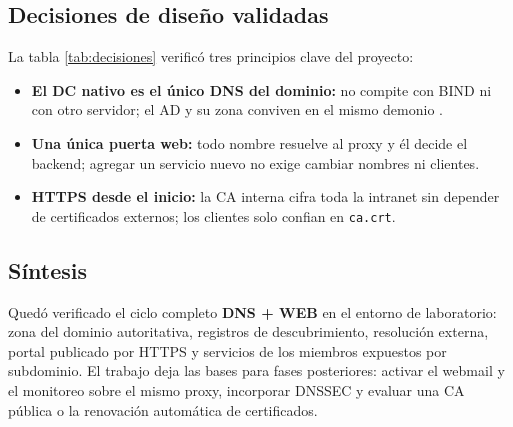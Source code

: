 \subsection{Decisiones de dise\~no validadas}

La tabla \ref{tab:decisiones} verific\'o tres principios clave del proyecto:

\begin{itemize}
  \item \textbf{El DC nativo es el \'unico DNS del dominio:} no compite con
        BIND ni con otro servidor; el AD y su zona conviven en el mismo
        demonio \citep{sambateam2024}.
  \item \textbf{Una \'unica puerta web:} todo nombre resuelve al proxy y \'el
        decide el backend; agregar un servicio nuevo no exige cambiar nombres
        ni clientes.
  \item \textbf{HTTPS desde el inicio:} la CA interna cifra toda la intranet
        sin depender de certificados externos; los clientes solo confian en
        \texttt{ca.crt}.
\end{itemize}

\subsection{S\'intesis}

Qued\'o verificado el ciclo completo \textbf{DNS + WEB} en el entorno de
laboratorio: zona del dominio autoritativa, registros de descubrimiento,
resoluci\'on externa, portal publicado por HTTPS y servicios de los miembros
expuestos por subdominio. El trabajo deja las bases para fases posteriores:
activar el webmail y el monitoreo sobre el mismo proxy, incorporar DNSSEC y
evaluar una CA p\'ublica o la renovaci\'on autom\'atica de certificados.